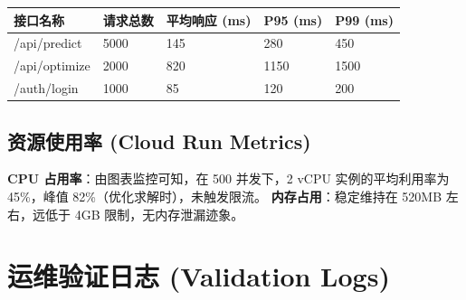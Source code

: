 \begin{table}[h]
    \centering
    \begin{tabular}{|l|l|l|l|l|}
        \hline
        \textbf{接口名称} & \textbf{请求总数} & \textbf{平均响应 (ms)} & \textbf{P95 (ms)} & \textbf{P99 (ms)} \\ \hline
        /api/predict  & 5000          & 145                & 280               & 450               \\ \hline
        /api/optimize & 2000          & 820                & 1150              & 1500              \\ \hline
        /auth/login   & 1000          & 85                 & 120               & 200               \\ \hline
    \end{tabular}
\end{table}

\subsection{资源使用率 (Cloud Run Metrics)}
\textbf{CPU 占用率}：由图表监控可知，在 500 并发下，2 vCPU 实例的平均利用率为 45\%，峰值 82\%（优化求解时），未触发限流。
\textbf{内存占用}：稳定维持在 520MB 左右，远低于 4GB 限制，无内存泄漏迹象。

\section{运维验证日志 (Validation Logs)}

